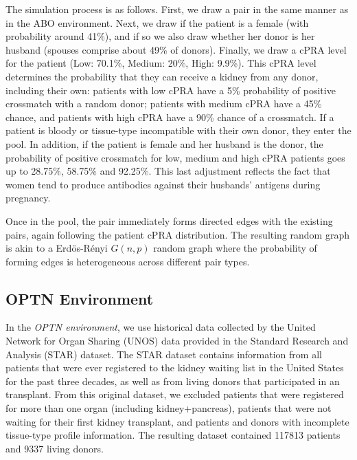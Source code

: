 \documentclass[format=acmsmall, review=false]{acmart}
\begin{document}
The simulation process is as follows. First, we draw a pair in the same manner as in the ABO environment. Next, we draw if the patient is a female (with probability around 41\%), and if so we also draw whether her donor is her husband (spouses comprise about 49\% of donors). Finally, we draw a  cPRA level for the patient (Low: 70.1\%, Medium: 20\%, High: 9.9\%). This cPRA level determines the probability that they can receive a kidney from any donor, including their own: patients with low cPRA have a 5\% probability of positive crossmatch with a random donor; patients with medium cPRA have a 45\% chance, and patients with high cPRA have a 90\% chance of a crossmatch. If a patient is bloody or tissue-type incompatible with their own donor, they enter the pool. In addition, if the patient is female and her husband is the donor, the probability of positive crossmatch for low, medium and high cPRA patients goes up to 28.75\%, 58.75\% and 92.25\%. This last adjustment reflects the fact that women tend to produce antibodies against their husbands' antigens during pregnancy.

Once in the pool, the pair immediately forms directed edges with the existing pairs, again following the patient cPRA distribution. The resulting random graph is akin to a Erd\"{o}s-R\'{e}nyi $G(n,p)$ random graph where the probability of forming edges is heterogeneous across different pair types.

\subsection{OPTN Environment}

In the \emph{OPTN environment}, we use historical data collected by the United Network for Organ Sharing (UNOS) data provided in the Standard Research and Analysis (STAR) dataset. The STAR dataset contains information from all patients that were ever registered to the kidney waiting list in the United States for the past three decades, as well as from living donors that participated in an transplant. From this original dataset, we excluded patients that were registered for more than one organ (including kidney+pancreas), patients that were not waiting for their first kidney transplant, and patients and donors with incomplete tissue-type profile information. The resulting dataset contained 117813 patients and 9337 living donors.
\end{document}
